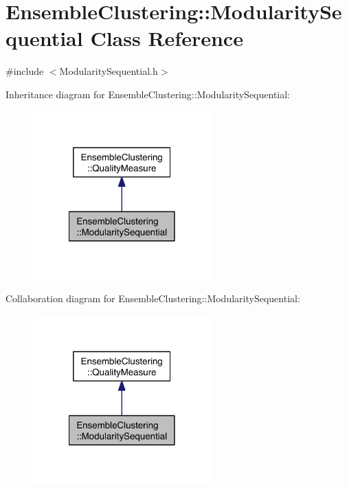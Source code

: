 \hypertarget{class_ensemble_clustering_1_1_modularity_sequential}{\section{Ensemble\-Clustering\-:\-:Modularity\-Sequential Class Reference}
\label{class_ensemble_clustering_1_1_modularity_sequential}
}


{\ttfamily \#include $<$Modularity\-Sequential.\-h$>$}



Inheritance diagram for Ensemble\-Clustering\-:\-:Modularity\-Sequential\-:
\nopagebreak
\begin{figure}[H]
\begin{center}
\leavevmode
\includegraphics[width=194pt]{class_ensemble_clustering_1_1_modularity_sequential__inherit__graph}
\end{center}
\end{figure}


Collaboration diagram for Ensemble\-Clustering\-:\-:Modularity\-Sequential\-:
\nopagebreak
\begin{figure}[H]
\begin{center}
\leavevmode
\includegraphics[width=194pt]{class_ensemble_clustering_1_1_modularity_sequential__coll__graph}
\end{center}
\end{figure}
